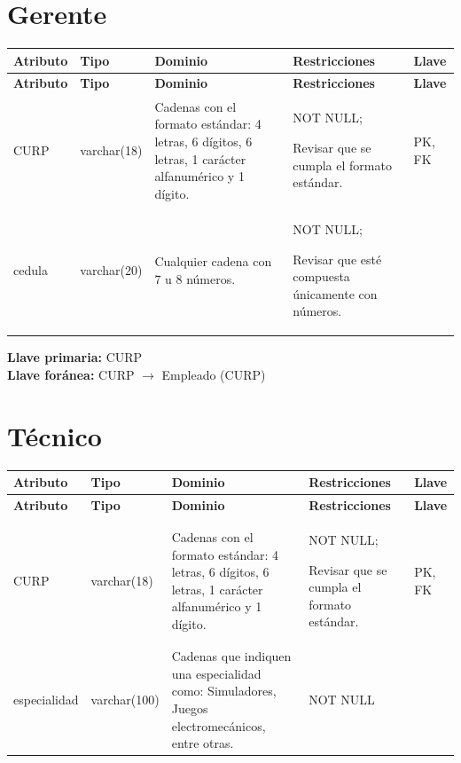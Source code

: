 \documentclass[12pt]{article}
\begin{document}
\section*{Gerente}

\begin{longtable}{p{3.2cm} p{2.2cm} p{4.8cm} p{4.2cm} p{1.2cm}}
\label{tab:gerente}\\
\toprule
\textbf{Atributo} & \textbf{Tipo} & \textbf{Dominio} & \textbf{Restricciones} & \textbf{Llave} \\
\midrule
\endfirsthead

\toprule
\textbf{Atributo} & \textbf{Tipo} & \textbf{Dominio} & \textbf{Restricciones} & \textbf{Llave} \\
\midrule
\endhead

\bottomrule
\endfoot

CURP 
& varchar(18) 
& Cadenas con el formato estándar: 4 letras, 6 dígitos, 6 letras, 1 carácter alfanumérico y 1 dígito.
& NOT NULL;

Revisar que se cumpla
el formato estándar.
& PK, FK \\

cedula 
& varchar(20)
& Cualquier cadena con 7 u 8 números.
& NOT NULL;

Revisar que esté compuesta únicamente con números.
& \\

\end{longtable}

\vspace{2pt}
\textbf{Llave primaria:} CURP\\
\textbf{Llave foránea:} CURP $\rightarrow$ Empleado (CURP)\\


\section*{Técnico}

\begin{longtable}{p{3.2cm} p{2.2cm} p{4.8cm} p{4.2cm} p{1.2cm}}
\label{tab:tecnico}\\
\toprule
\textbf{Atributo} & \textbf{Tipo} & \textbf{Dominio} & \textbf{Restricciones} & \textbf{Llave} \\
\midrule
\endfirsthead

\toprule
\textbf{Atributo} & \textbf{Tipo} & \textbf{Dominio} & \textbf{Restricciones} & \textbf{Llave} \\
\midrule
\endhead

\bottomrule
\endfoot

CURP 
& varchar(18) 
& Cadenas con el formato estándar: 4 letras, 6 dígitos, 6 letras, 1 carácter alfanumérico y 1 dígito.
& NOT NULL;

Revisar que se cumpla
el formato estándar.
& PK, FK \\

especialidad 
& varchar(100)
& Cadenas que indiquen una especialidad como: Simuladores, Juegos electromecánicos, entre otras.
& NOT NULL
& \\

\end{longtable}
\end{document}
